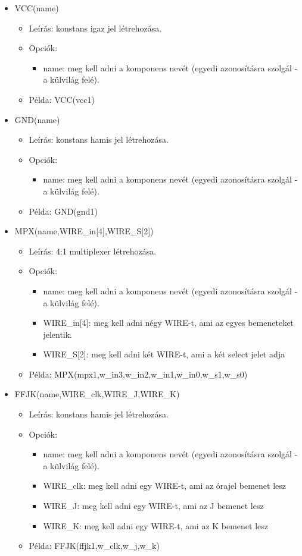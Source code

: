 \begin{itemize}
\item VCC(name)
	\begin{itemize}
	\item Leírás: konstans igaz jel létrehozása.
	\item Opciók: 
		\begin{itemize}
			\item name: meg kell adni a komponens nevét (egyedi azonosításra szolgál - a külvilág felé).
		\end{itemize}
	\item Példa: VCC(vcc1)
	\end{itemize}
	
\item GND(name)
	\begin{itemize}
	\item Leírás: konstans hamis jel létrehozása.
	\item Opciók: 
		\begin{itemize}
			\item name: meg kell adni a komponens nevét (egyedi azonosításra szolgál - a külvilág felé).
		\end{itemize}
	\item Példa: GND(gnd1)
	\end{itemize}	

\item MPX(name,WIRE\_in[4],WIRE\_S[2])
	\begin{itemize}
	\item Leírás: 4:1 multiplexer létrehozása.
	\item Opciók: 
		\begin{itemize}
			\item name: meg kell adni a komponens nevét (egyedi azonosításra szolgál - a külvilág felé).
			\item WIRE\_in[4]: meg kell adni négy WIRE-t, ami az egyes bemeneteket jelentik.
			\item WIRE\_S[2]: meg kell adni két WIRE-t, ami a két select jelet adja
		\end{itemize}
	\item Példa: MPX(mpx1,w\_in3,w\_in2,w\_in1,w\_in0,w\_s1,w\_s0)
	\end{itemize}	
	
\item FFJK(name,WIRE\_clk,WIRE\_J,WIRE\_K)
	\begin{itemize}
	\item Leírás: konstans hamis jel létrehozása.
	\item Opciók: 
		\begin{itemize}
			\item name: meg kell adni a komponens nevét (egyedi azonosításra szolgál - a külvilág felé).
			\item WIRE\_clk: meg kell adni egy WIRE-t, ami az órajel bemenet lesz
			\item WIRE\_J: meg kell adni egy WIRE-t, ami az J bemenet lesz
			\item WIRE\_K: meg kell adni egy WIRE-t, ami az K bemenet lesz			
		\end{itemize}
	\item Példa: FFJK(ffjk1,w\_clk,w\_j,w\_k)
	\end{itemize}


\end{itemize}
